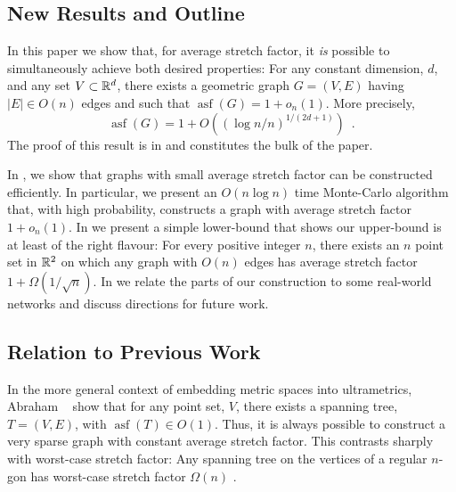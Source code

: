 \documentclass{patmorin}
\DeclareMathOperator{\asf}{asf}
\newcommand{\eps}{\varepsilon}
\begin{document}

\subsection{New Results and Outline}

In this paper we show that, for average stretch factor, it \emph{is}
possible to simultaneously achieve both desired properties: For any
constant dimension, $d$, and any set $V\subset \mathbb{R}^d$, there exists
a geometric graph $G=(V,E)$ having $|E|\in O(n)$ edges and such that
$\asf(G)=1+o_n(1)$.  More precisely,
\[
   \asf(G)=1+O((\log n/n)^{1/(2d+1)}) \enspace .
\]
The proof of this result is in  and constitutes the
bulk of the paper.  

In , we show that graphs with small average stretch
factor can be constructed efficiently.  In particular, we present an
$O(n\log n)$ time Monte-Carlo algorithm that, with high probability,
constructs a graph with average stretch factor $1+o_n(1)$.  
In  we present a simple lower-bound that shows our
upper-bound is at least of the right flavour:  For every positive integer
$n$, there exists an $n$ point set in $\mathbb{R}^2$ on which any graph with
$O(n)$ edges has average stretch factor $1+\Omega(1/\sqrt{n})$.
In  we relate the parts of our construction to some
real-world networks and discuss directions for future work.

\subsection{Relation to Previous Work}


In the more general context of embedding metric spaces into ultrametrics,
Abraham \etal\ \cite{abraham.bartal.ea:metric,abraham.bartal.ea:embedding}
show that for any point set, $V$, there exists a spanning tree,
$T=(V,E)$, with $\asf(T)\in O(1)$.  Thus, it is always possible to
construct a very sparse graph with constant average stretch factor.
This contrasts sharply with worst-case stretch factor: Any spanning
tree on the vertices of a regular $n$-gon has worst-case stretch factor
$\Omega(n)$ \cite[Lemma~15]{eppstein:spanning-report}.
\end{document}
